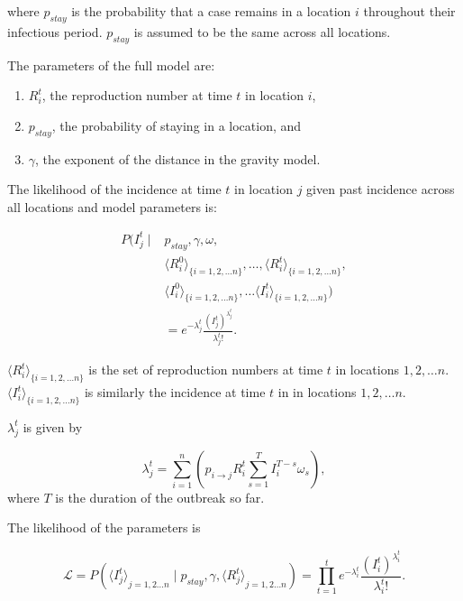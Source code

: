 \documentclass[9pt,twocolumn,twoside,lineno]{pnas-new}
\begin{document}
{where \(p_{stay}\) is the probability that a case remains in a location
\(i\) throughout their infectious period. \(p_{stay}\) is assumed to be
the same across all locations.

The parameters of the full model are:

\begin{enumerate}
\def\labelenumi{\arabic{enumi}.}
\item
  \(R_{i}^{t}\), the reproduction number at time \(t\) in location
  \(i\),
\item
  \(p_{stay}\), the probability of staying in a location, and
\item
  \(\gamma\), the exponent of the distance in the gravity model.
\end{enumerate}

The likelihood of the incidence at time \(t\) in location \(j\) given
past incidence across all locations and model parameters is:

\begin{equation*}
  \begin{aligned}
P ( 
I_{j}^{t} \mid 
& p_{stay}, \gamma, \omega, \\
& {\langle R_{i}^{0} \rangle}_{\{i = 1, 2, \dots n\}}, \hdots, {\langle R_{i}^{t} \rangle}_{\{i = 1, 2, \dots n\}}, \\
& {\langle I_{i}^{0} \rangle}_{\{i = 1, 2, \dots n\}}, \hdots {\langle I_{i}^{t} \rangle}_{\{i = 1, 2, \dots n\}} ) \\
& =  e^{-\lambda_{j}^{t}}  \frac{ {\left( I_{j}^{t}\right)}^{\lambda_{j}^{t}}}{\lambda_{j}^{t} !}.
\end{aligned}
\end{equation*}

\({\langle R_{i}^{t} \rangle}_{\{i = 1, 2, \dots n\}}\) is the set of
reproduction numbers at time \(t\) in locations \(1, 2, \dots n\).
\({\langle I_{i}^{t} \rangle}_{\{i = 1, 2, \dots n\}}\) is similarly the
incidence at time \(t\) in in locations \(1, 2, \dots n\).

\(\lambda_{j}^{t}\) is given by

\begin{equation}
\lambda_{j}^{t} = \sum_{i = 1}^n{\left(p_{i \rightarrow j}R_{i}^{t} \sum_{s
        = 1}^T{I_{i}^{T - s} \omega_{s}} \right)},
\label{eq:lambdajt}
\end{equation} where \(T\) is the duration of the outbreak so far.

The likelihood of the parameters is

\begin{equation*}
  \mathcal{L} = P
  \left(
    {\langle I_{j}^{t} \rangle}_{j = 1, 2 \dots n} \mid
    p_{stay},
    \gamma,
    {\langle R_{j}^{t} \rangle}_{j = 1, 2 \dots n}\right) = 
     \prod_{t = 1}^{t}{e^{-\lambda_{i}^{t}} 
       \frac{\left(I_{i}^{t}\right)^{\lambda_{i}^{t}}}{\lambda_{i}^{t} !}}.
  \end{equation*}

}
\end{document}

